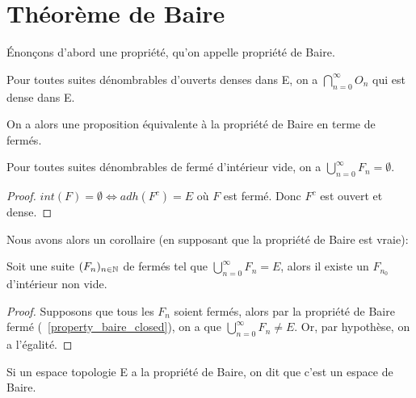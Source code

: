 \chapter{Théorème de Baire}
\label{chapter_baire_theorem}

Énonçons d'abord une propriété, qu'on appelle propriété de Baire.

\begin{propriete} 
\label{property_baire_open}
	Pour toutes suites dénombrables d'ouverts denses dans E, on a $\displaystyle
	\bigcap_{n = 0}^{\infty} O_{n}$ qui est dense dans E.
\end{propriete}

On a alors une proposition équivalente à la propriété de Baire en terme de
fermés.

\begin{propriete} 
\label{property_baire_closed}
	Pour toutes suites dénombrables de fermé d'intérieur vide, on a
	$\displaystyle \bigcup_{n = 0}^{\infty} F_{n} = \emptyset$.
\end{propriete}

\ifdefined\outputproof
\begin{proof}
	$int(F) = \emptyset \Leftrightarrow adh(F^{c}) = E$ où $F$ est fermé. Donc
	$F^{c}$ est ouvert et dense.
\end{proof}
\fi

Nous avons alors un corollaire (en supposant que la propriété de Baire est
vraie):

\begin{corollary}
\label{corollary_baire_int_non_empty}
	Soit une suite $(F_{n})_{n \in \mathbb{N}}$ de fermés tel que $\displaystyle
	\bigcup_{n = 0}^{\infty}{F_{n}} = E$, alors il existe un $F_{n_{0}}$
	d'intérieur non vide.
\end{corollary}

\ifdefined\outputproof
\begin{proof}
	Supposons que tous les $F_{n}$ soient fermés, alors par la
	propriété de Baire fermé (~\ref{property_baire_closed}), on a que
	$\displaystyle \bigcup_{n = 0}^{\infty}{F_{n}} \neq E$. Or, par hypothèse,
	on a l'égalité.
\end{proof}
\fi

\begin{definition} 
\label{definition_baire_space}
	Si un espace topologie E a la propriété de Baire, on dit que c'est un espace
	de Baire.
\end{definition}

